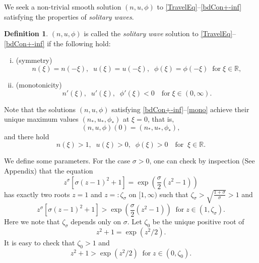 \documentclass{amsart}
\numberwithin{equation}{section}
\theoremstyle{plain}%
\theoremstyle{definition}
\newtheorem*{defi*}{Definition}
\theoremstyle{remark}
\theoremstyle{remark}
\begin{document}
 We seek a non-trivial smooth solution $(n,u,\phi)$ to \eqref{TravelEq}--\eqref{bdCon+-inf} satisfying 
 the properties of \emph{solitary waves}.
\begin{defi*}\label{solitary-def}
 $(n,u,\phi)$ is called the \emph{solitary wave} solution to  \eqref{TravelEq}--\eqref{bdCon+-inf}
  if the following hold:
 \begin{enumerate}[(i)]
\item (symmetry)
\begin{equation}  
 n(\xi)=n(-\xi),\;\; u(\xi)=u(-\xi), \;\; \phi(\xi)=\phi(-\xi) \;\;  \text{for} \; \xi \in \mathbb{R}, \label{Symmetric} 
\end{equation}
\item (monotonicity)
\begin{equation}\label{mono}
 n'(\xi), \;\; u'(\xi), \;\; \phi'(\xi)<0  \quad  \text{for} \; \xi \in (0,\infty).
\end{equation}
\end{enumerate}
\end{defi*} 
Note that the solutions $(n,u,\phi)$ satisfying \eqref{bdCon+-inf}--\eqref{mono} achieve their unique maximum values $(n_*, u_*, \phi_*)$ at $\xi=0$, that is, 
\begin{equation}\label{max-v}
(n,u,\phi)(0) = (n_*, u_*, \phi_*),
\end{equation} and there hold
\begin{equation}\label{SignOfSols} 
n(\xi)>1, \;\; u(\xi)>0, \;\; \phi(\xi)>0 \quad \text{for} \;\; \xi\in \mathbb{R}. 
\end{equation}



We define some parameters.
For the case $\sigma>0$, one can check by inspection (See Appendix) that the equation
\begin{equation}\label{Aux3 lem-1}
z^{\sigma}\left[\sigma(z - 1)^2 + 1 \right]  =
\exp \left(\frac{\sigma}{2}\left(z^2 - 1 \right) \right)
\end{equation} 
has exactly two roots $z=1$ and $z=: \zeta_\sigma$ on $[1,\infty)$ such that 
$\zeta_{\sigma}>\sqrt{\frac{1+\sigma}{\sigma}}>1$ and
\begin{equation}\label{Aux4-1 lem}
z^{\sigma}\left[\sigma(z - 1)^2 + 1 \right]  >
\exp \left(\frac{\sigma}{2}\left(z^2 - 1 \right) \right) \;\; \text{for}\; z\in(1,\zeta_\sigma).
\end{equation}
Here we note that $\zeta_{\sigma}$  depends only on $\sigma$.
Let $\zeta_0$ be the unique positive root of
\begin{equation}\label{Eq z0 Cold-1}
z^2+1 = \exp(z^2/2).
\end{equation}
It is easy to check that $\zeta_0>1$ and 
\begin{equation}\label{Eq z_0 Cold}
z^2+1 > \exp(z^2/2) \;\; \text{for} \; z\in(0,\zeta_0).
\end{equation}
 
\end{document}
